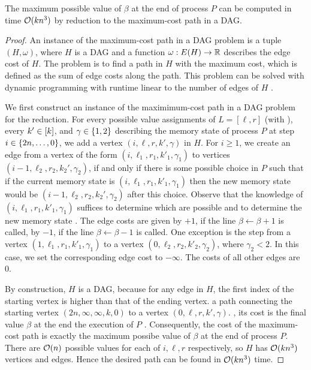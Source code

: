 \begin{lemma}
\label{lem:ham_path}
The maximum possible value of $\beta$ at the end of process $P$ can be computed in time $\mathcal{O}(kn^3)$ by reduction to the maximum-cost path in a DAG.
\end{lemma}
\begin{proof}
An instance of the maximum-cost path in a DAG problem is a tuple $(H, \omega)$, where $H$ is a DAG and a function $\omega: E(H) \to \mathbb{R}$ describes the edge cost of $H$.
The problem is to find a path in $H$ with the maximum cost, which is defined as the sum of edge costs along the path.
This problem can be solved with dynamic programming with runtime linear to the number of edges  of $H$ .

We first construct an instance of the maximimum-cost path in a DAG problem for the reduction. 
For every possible value assignments of $L = [\ell, r]$ (with ), every $k' \in [k]$, and $\gamma \in \{ 1,2 \}$ describing the memory state of process $P$ at step $i \in \{ 2n, \ldots, 0 \}$, we add a vertex $(i,\ell,r,k',\gamma)$ in $H$. 
For $i \geq 1$, we create an edge from a vertex of the form $(i,\ell_1,r_1,k'_1,\gamma_1)$ to vertices $(i-1,\ell_2,r_2,k_2',\gamma_2)$, if and only if there is some possible choice in $P$ such that if the current memory state is $(i,\ell_1,r_1,k'_1,\gamma_1)$ then the new memory state would be $(i-1, \ell_2, r_2, k_2',\gamma_2)$ after this choice. 
Observe that the knowledge of $(i, \ell_1, r_1, k'_1,\gamma_1)$ suffices to determine which  are possible and to determine the new memory state . 
The edge costs are given by $+1$, if the line $\beta \leftarrow \beta + 1$ is called, by $-1$, if the line $\beta \leftarrow \beta- 1$ is called.
One exception is the step from a vertex $(1,\ell_1,r_1,k'_1,\gamma_1)$ to a vertex $(0,\ell_2,r_2,k'_2,\gamma_2)$, where $\gamma_2 < 2$.
In this case, we set the corresponding edge cost to $-\infty$.
The costs of all other edges are 0.

By construction, $H$ is a DAG, because for any edge in $H$, the first index of the starting vertex is higher than that of the ending vertex.
 a path connecting the starting vertex $(2n, \infty, \infty, k, 0)$ to a vertex $(0, \ell, r, k', \gamma)$. , its cost is the final value  $\beta$ at the end  the execution of $P$ .
Consequently, the cost of the maximum-cost path is exactly the maximum possibe value of $\beta$ at the end of process $P$. 
There are $\mathcal{O}(n)$ possible values for each of $i, \ell, r$ respectively, so $H$ has $\mathcal{O}(kn^3)$ vertices and edges. Hence the desired path can be found in $\mathcal{O}(kn^3)$ time.
 
\end{proof}

